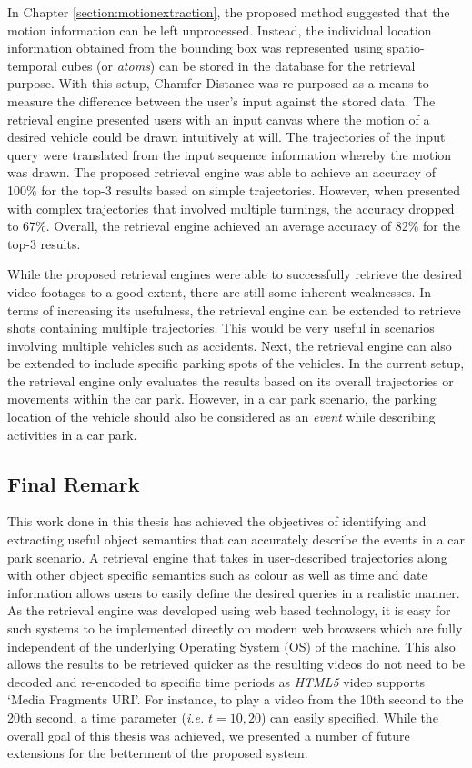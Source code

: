 In Chapter \ref{section:motionextraction}, the proposed method suggested that the motion information can be left unprocessed. Instead, the individual location information obtained from the bounding box was represented using spatio-temporal cubes (or \textit{atoms}) can be stored in the database for the retrieval purpose. With this setup, Chamfer Distance was re-purposed as a means to measure the difference between the user's input against the stored data. The retrieval engine presented users with an input canvas where the motion of a desired vehicle could be drawn intuitively at will. The trajectories of the input query were translated from the input sequence information whereby the motion was drawn. The proposed retrieval engine was able to achieve an accuracy of 100\% for the top-3 results based on simple trajectories. However, when presented with complex trajectories that involved multiple turnings, the accuracy dropped to 67\%. Overall, the retrieval engine achieved an average accuracy of 82\% for the top-3 results.

While the proposed retrieval engines were able to successfully retrieve the desired video footages to a good extent, there are still some inherent weaknesses. In terms of increasing its usefulness, the retrieval engine can be extended to retrieve shots containing multiple trajectories. This would be very useful in scenarios involving multiple vehicles such as accidents. Next, the retrieval engine can also be extended to include specific parking spots of the vehicles. In the current setup, the retrieval engine only evaluates the results based on its overall trajectories or movements within the car park. However, in a car park scenario, the parking location of the vehicle should also be considered as an \emph{event} while describing activities in a car park.

\vspace{1em}
\subsection*{Final Remark}
This work done in this thesis has achieved the objectives of identifying and extracting useful object semantics that can accurately describe the events in a car park scenario. A retrieval engine that takes in user-described trajectories along with other object specific semantics such as colour as well as time and date information allows users to easily define the desired queries in a realistic manner. As the retrieval engine was developed using web based technology, it is easy for such systems to be implemented directly on modern web browsers which are fully independent of the underlying Operating System (OS) of the machine. This also allows the results to be retrieved quicker as the resulting videos do not need to be decoded and re-encoded to specific time periods as \emph{HTML5} video supports `Media Fragments URI'. For instance, to play a video from the 10th second to the 20th second, a time parameter (\emph{i.e.} $t=10,20$) can easily specified. While the overall goal of this thesis was achieved, we presented a number of future extensions for the betterment of the proposed system.